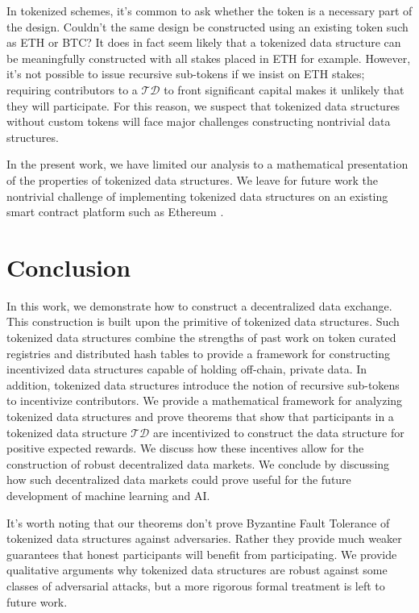 \documentclass{llncs}
\begin{document}
In tokenized schemes, it's common to ask whether the token is a necessary part of the design. Couldn't the same design be constructed using an existing token such as ETH or BTC? It does in fact seem likely that a tokenized data structure can be meaningfully constructed with all stakes placed in ETH for example. However, it's not possible to issue recursive sub-tokens if we insist on ETH stakes; requiring contributors to a $\mathcal{TD}$ to front significant capital makes it unlikely that they will participate. For this reason, we suspect that tokenized data structures without custom tokens will face major challenges constructing nontrivial data structures.

In the present work, we have limited our analysis to a mathematical presentation of the properties of tokenized data structures. We leave for future work the nontrivial challenge of implementing tokenized data structures on an existing smart contract platform such as Ethereum \cite{buterin2013ethereum}.

\section{Conclusion}

In this work, we demonstrate how to construct a decentralized data exchange. This construction is built upon the primitive of tokenized data structures. Such tokenized data structures combine the strengths of past work on token curated registries \cite{goldin2017tcr} and distributed hash tables \cite{stoica2003chord} to provide a framework for constructing incentivized data structures capable of holding off-chain, private data. In addition, tokenized data structures introduce the notion of recursive sub-tokens to incentivize contributors. We provide a mathematical framework for analyzing tokenized data structures and prove theorems that show that participants in a tokenized data structure $\mathcal{TD}$ are incentivized to construct the data structure for positive expected rewards. We discuss how these incentives allow for the construction of robust decentralized data markets. We conclude by discussing how such decentralized data markets could prove useful for the future development of machine learning and AI.

It's worth noting that our theorems don't prove Byzantine Fault Tolerance of tokenized data structures against adversaries. Rather they provide much weaker guarantees that honest participants will benefit from participating. We provide qualitative arguments why tokenized data structures are robust against some classes of adversarial attacks, but a more rigorous formal treatment is left to future work.

\medskip
\printbibliography
\end{document}

